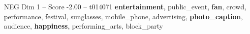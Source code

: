 \begin{textsample}{NEG Dim 1 – Score -2.00 – t014071}  \label{ex:f1_neg_017}
\textbf{entertainment}, public\_event, \textbf{fan}, crowd, performance, festival, sunglasses, mobile\_phone, advertising, \textbf{photo\_caption}, audience, \textbf{happiness}, performing\_arts, block\_party

\end{textsample}
